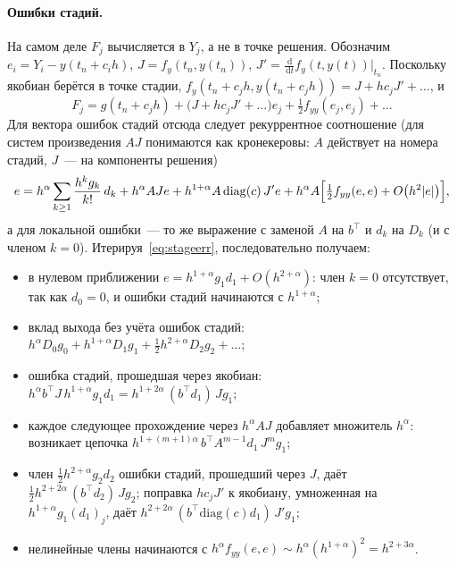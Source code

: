 \documentclass[11pt,a4paper]{article}
\theoremstyle{plain}
\theoremstyle{definition}
\newcommand{\dd}{\,\mathrm{d}}
\begin{document}
\paragraph{Ошибки стадий.} На самом деле $F_j$ вычисляется в $Y_j$, а не в точке решения. Обозначим $e_i=Y_i-y(t_n+c_ih)$, $J=f_y(t_n,y(t_n))$, $J'=\frac{\dd}{\dd t}f_y(t,y(t))\big|_{t_n}$. Поскольку якобиан берётся в точке стадии, $f_y(t_n+c_jh,y(t_n+c_jh))=J+hc_jJ'+\dots$, и
\[
F_j=g(t_n+c_jh)+\bigl(J+hc_jJ'+\dots\bigr)e_j+\tfrac12f_{yy}(e_j,e_j)+\dots
\]
Для вектора ошибок стадий отсюда следует рекуррентное соотношение (для систем произведения $AJ$ понимаются как кронекеровы: $A$ действует на номера стадий, $J$~--- на компоненты решения)
\begin{equation}\label{eq:stageerr}
e=h^{\alpha}\sum_{k\ge1}\frac{h^k g_k}{k!}\,d_k+h^{\alpha}AJe+h^{1+\alpha}A\,\mathrm{diag}(c)\,J'e+h^{\alpha}A\Bigl[\tfrac12f_{yy}(e,e)+O\bigl(h^2|e|\bigr)\Bigr],
\end{equation}
а для локальной ошибки~--- то же выражение с заменой $A$ на $b^{\top}$ и $d_k$ на $D_k$ (и с членом $k=0$). Итерируя~\eqref{eq:stageerr}, последовательно получаем:
\begin{itemize}
\item в нулевом приближении $e=h^{1+\alpha}g_1d_1+O(h^{2+\alpha})$: член $k=0$ отсутствует, так как $d_0=0$, и ошибки стадий начинаются с $h^{1+\alpha}$;
\item вклад выхода без учёта ошибок стадий: $h^{\alpha}D_0g_0+h^{1+\alpha}D_1g_1+\frac12h^{2+\alpha}D_2g_2+\dots$;
\item ошибка стадий, прошедшая через якобиан: $h^{\alpha}b^{\top}J\,h^{1+\alpha}g_1d_1=h^{1+2\alpha}\,(b^{\top}d_1)\,Jg_1$;
\item каждое следующее прохождение через $h^{\alpha}AJ$ добавляет множитель $h^{\alpha}$: возникает цепочка $h^{1+(m+1)\alpha}\,b^{\top}A^{m-1}d_1\,J^mg_1$;
\item член $\frac12h^{2+\alpha}g_2d_2$ ошибки стадий, прошедший через $J$, даёт $\frac12h^{2+2\alpha}\,(b^{\top}d_2)\,Jg_2$; поправка $hc_jJ'$ к якобиану, умноженная на $h^{1+\alpha}g_1(d_1)_j$, даёт $h^{2+2\alpha}\,(b^{\top}\mathrm{diag}(c)d_1)\,J'g_1$;
\item нелинейные члены начинаются с $h^{\alpha}f_{yy}(e,e)\sim h^{\alpha}(h^{1+\alpha})^2=h^{2+3\alpha}$.
\end{itemize}
\end{document}
